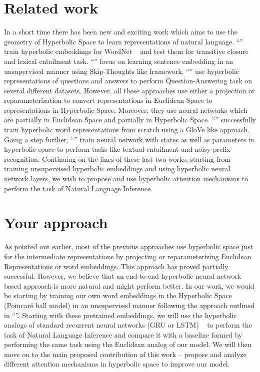 \documentclass[11pt,a4paper]{article}
\begin{document}
\section{Related work}
In a short time there has been new and exciting work which aims to use the geometry of Hyperbolic Space to learn representations of natural language. ``'' train hyperbolic embeddings for WordNet ~\cite{Miller95wordnet} and test them for transitive closure and lexical entailment task. ``'' focus on learning sentence embedding in an unsupervised manner using Skip-Thoughts \cite{skipthought} like framework. ``'' use hyperbolic representations of questions and answers to perform Question-Answering task on several different datasets. However, all these approaches use either a projection or reparameterization to convert representations in Euclidean Space to representations in Hyperbolic Space. Moreover, they use neural networks which are partially in Euclidean Space and partially in Hyperbolic Space. ``'' successfully train hyperbolic word representations from scratch using a GloVe \cite{glove} like approach. Going a step further, ``'' train neural network with states as well as parameters in hyperbolic space to perform tasks like textual entailment and noisy prefix recognition. Continuing on the lines of these last two works, starting from training unsupervised hyperbolic embeddings and using hyperbolic neural network layers, we wish to propose and use hyperbolic attention mechanisms to perform the task of Natural Language Inference.


\section{Your approach}

As pointed out earlier, most of the previous approaches use hyperbolic space just for the intermediate representations by projecting or reparameterizing Euclidean Representations or word embeddings. This approach has proved partially successful. However, we believe that an end-to-end hyperbolic neural network based approach is more natural and might perform better. In our work, we would be starting by training our own word embeddings in the Hyperbolic Space (Poincar\'e ball model) in an unsupervised manner following the approach outlined in ``''. Starting with these pretrained embeddings, we will use the hyperbolic analogs of standard recurrent neural networks (GRU or LSTM) ~\cite{hyperbolicnn} to perform the task of Natural Language Inference and compare it with a baseline formed by performing the same task using the Euclidean analog of our model. We will then move on to the main proposed contribution of this work -- propose and analyze different attention mechanisms in hyperbolic space to improve our model. 
\end{document}
